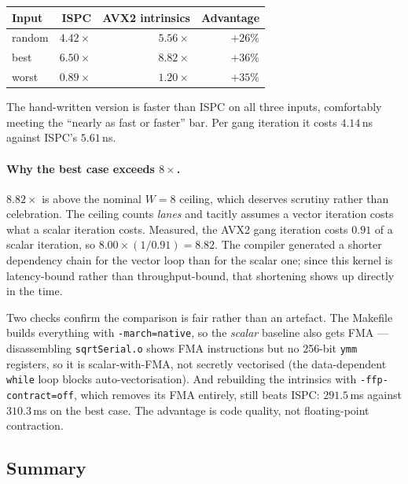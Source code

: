 \documentclass[11pt,a4paper]{article}
\begin{document}
\begin{center}
\begin{tabular}{lrrr}
\toprule
Input & ISPC & AVX2 intrinsics & Advantage \\
\midrule
random & $4.42\times$ & $\mathbf{5.56\times}$ & $+26\%$ \\
best   & $6.50\times$ & $\mathbf{8.82\times}$ & $+36\%$ \\
worst  & $0.89\times$ & $\mathbf{1.20\times}$ & $+35\%$ \\
\bottomrule
\end{tabular}
\end{center}

The hand-written version is faster than ISPC on all three inputs, comfortably
meeting the ``nearly as fast or faster'' bar. Per gang iteration it costs
$4.14$\,ns against ISPC's $5.61$\,ns.

\paragraph{Why the best case exceeds $8\times$.} $8.82\times$ is above the
nominal $W = 8$ ceiling, which deserves scrutiny rather than celebration. The
ceiling counts \emph{lanes} and tacitly assumes a vector iteration costs what a
scalar iteration costs. Measured, the AVX2 gang iteration costs $0.91$ of a
scalar iteration, so $8.00 \times (1/0.91) = 8.82$. The compiler generated a
shorter dependency chain for the vector loop than for the scalar one; since
this kernel is latency-bound rather than throughput-bound, that shortening
shows up directly in the time.

Two checks confirm the comparison is fair rather than an artefact. The Makefile
builds everything with \texttt{-march=native}, so the \emph{scalar} baseline
also gets FMA --- disassembling \texttt{sqrtSerial.o} shows FMA instructions but
no 256-bit \texttt{ymm} registers, so it is scalar-with-FMA, not secretly
vectorised (the data-dependent \texttt{while} loop blocks auto-vectorisation).
And rebuilding the intrinsics with \texttt{-ffp-contract=off}, which removes
its FMA entirely, still beats ISPC: $291.5$\,ms against $310.3$\,ms on the best
case. The advantage is code quality, not floating-point contraction.

\subsection{Summary}
\end{document}
